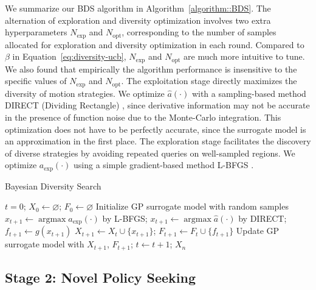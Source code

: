 We summarize our BDS algorithm in Algorithm~\ref{algorithm::BDS}. The alternation of exploration and diversity optimization involves two extra hyperparameters $N_\text{exp}$ and $N_\text{opt}$, corresponding to the number of samples allocated for exploration and diversity optimization in each round. Compared to $\beta$ in Equation~\ref{eq:diversity-ucb}, $N_\text{exp}$ and $N_\text{opt}$ are much more intuitive to tune. We also found that empirically the algorithm performance is insensitive to the specific values of $N_\text{exp}$ and $N_\text{opt}$. The exploitation stage directly maximizes the diversity of motion strategies. We optimize $\hat{a}(\cdot)$ with a sampling-based method DIRECT (Dividing Rectangle) \cite{Jones2001-DIRECT}, since derivative information may not be accurate in the presence of function noise due to the Monte-Carlo integration. This optimization does not have to be perfectly accurate, since the surrogate model is an approximation in the first place. The exploration stage facilitates the discovery of diverse strategies by avoiding repeated queries on well-sampled regions. We optimize $a_\text{exp}(\cdot)$ using a simple gradient-based method L-BFGS \cite{LBFGS}.

\begin{algorithm}[t]
\caption{Bayesian Diversity Search}\label{algorithm::BDS}
$t=0$; $X_0 \leftarrow \varnothing$; $F_0 \leftarrow \varnothing$\;
Initialize GP surrogate model with random samples\;
{
{
$x_{t+1} \leftarrow \mathop{\arg\max}a_\text{exp}(\cdot)$ by L-BFGS; 
}
{
$x_{t+1} \leftarrow \mathop{\arg\max}\hat{a}(\cdot)$ by DIRECT; 
}
$f_{t+1} \leftarrow g(x_{t+1})$\; 
$X_{t+1} \leftarrow X_t \cup \{x_{t+1}\}$; $F_{t+1} \leftarrow F_t \cup \{f_{t+1}\}$\;
Update GP surrogate model with $X_{t+1}$, $F_{t+1}$;
\hspace{8pt}
$t \leftarrow t+1$;
}
\Return $X_n$
\end{algorithm}

\subsection{Stage 2: Novel Policy Seeking}
\label{sec:methods-phase2}

